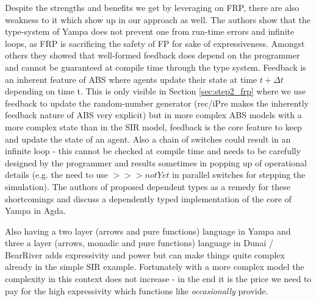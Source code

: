 Despite the strengths and benefits we get by leveraging on FRP, there are also weakness to it which show up in our approach as well. The authors \cite{sculthorpe_safe_2009} show that the type-system of Yampa does not prevent one from run-time errors and infinite loops, as FRP is sacrificing the safety of FP for sake of expressiveness. Amongst others they showed that well-formed feedback does depend on the programmer and cannot be guaranteed at compile time through the type system. Feedback is an inherent feature of ABS where agents update their state at time $t + \Delta t$ depending on time t. This is only visible in Section \ref{sec:step2_frp} where we use feedback to update the random-number generator (rec/iPre makes the inherently feedback nature of ABS very explicit) but in more complex ABS models with a more complex state than in the SIR model, feedback is the core feature to keep and update the state of an agent. Also a chain of switches could result in an infinite loop - this cannot be checked at compile time and needs to be carefully designed by the programmer and results sometimes in popping up of operational details (e.g. the need to use $>>> notYet$ in parallel switches for stepping the simulation). The authors of \cite{sculthorpe_safe_2009} proposed dependent types as a remedy for these shortcomings and discuss a dependently typed implementation of the core of Yampa in Agda.

Also having a two layer (arrows and pure functions) language in Yampa \cite{jeffrey_causality_2013} and three a layer (arrows, monadic and pure functions) language in Dunai / BearRiver adds expressivity and power but can make things quite complex already in the simple SIR example. Fortunately with a more complex model the complexity in this context does not increase - in the end it is the price we need to pay for the high expressivity which functions like \textit{occasionally} provide.

